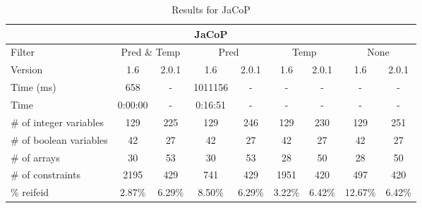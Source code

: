 \documentclass{standalone}
\begin{document}
\begin{table}[H]
\footnotesize
\centering
\begin{tabular}{lc|c|c|c|c|c|c|c}
\multicolumn{9}{c}{JaCoP} \\ 
\hline\hline Filter & \multicolumn{2}{c|}{Pred \& Temp} &\multicolumn{2}{c|}{Pred}  & \multicolumn{2}{c|}{Temp} & \multicolumn{2}{c}{None} \\ 
\hline Version & 1.6 & 2.0.1 & 1.6 & 2.0.1 & 1.6 & 2.0.1 & 1.6 & 2.0.1 \\ 
Time (ms)               & 658 & - & 1011156 & - & - & - & - & - \\
Time                    & 0:00:00 & - & 0:16:51 & - & - & - & - & - \\ 
\# of integer variables & 129 & 225 & 129 & 246 & 129 & 230 & 129 & 251 \\ 
\# of boolean variables & 42 & 27 & 42 & 27 & 42 & 27 & 42 & 27 \\ 
\# of arrays            & 30 & 53 & 30 & 53 & 28 & 50 & 28 & 50 \\ 
\# of constraints       & 2195 & 429 & 741 & 429 & 1951 & 420 & 497 & 420 \\ 
\% reifeid               & 2.87\% & 6.29\% & 8.50\% & 6.29\% & 3.22\% & 6.42\% & 12.67\% & 6.42\% \\ 
\end{tabular}
\caption{Results for JaCoP}\label{tab:res_jacop}
\end{table}
\end{document}
